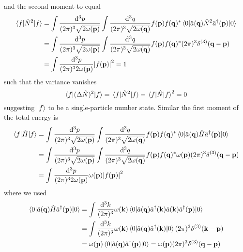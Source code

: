 and the second moment to equal
\begin{equation}
	\begin{split}
		\expval{\hat{N}^2}{f}
		&=
		\int\frac{\dd[3]{p}}{(2\pi)^3\sqrt{2\omega(\vb{p})}}
		\int\frac{\dd[3]{q}}{(2\pi)^3\sqrt{2\omega(\vb{q})}}
		f(\vb{p})f(\vb{q})^*
		\expval{\hat{a}(\vb{q})\hat{N}^2\hat{a}^\dagger(\vb{p})}{0}
		\\
		&=
		\int\frac{\dd[3]{p}}{(2\pi)^3\sqrt{2\omega(\vb{p})}}
		\int\frac{\dd[3]{q}}{(2\pi)^3\sqrt{2\omega(\vb{q})}}
		f(\vb{p})f(\vb{q})^*
		(2\pi)^3\delta^{(3)}(\vb{q}-\vb{p})
		\\
		&=
		\int\frac{\dd[3]{p}}{(2\pi)^32\omega(\vb{p})}
		\abs{f(\vb{p})}^2
		=
		1
	\end{split}
\end{equation}
such that the variance vanishes
\begin{equation}
	\expval{(\Delta\hat{N})^2}{f}
	=
	\expval{\hat{N}^2}{f}
	-
	\expval{\hat{N}}{f}^2
	=
	0
\end{equation}
suggesting $\ket{f}$ to be a single-particle number state.
Similar the first moment of the total energy is
\begin{equation}
	\begin{split}
		\expval{\hat{H}}{f}
		&=
		\int\frac{\dd[3]{p}}{(2\pi)^3\sqrt{2\omega(\vb{p})}}
		\int\frac{\dd[3]{q}}{(2\pi)^3\sqrt{2\omega(\vb{q})}}
		f(\vb{p})f(\vb{q})^*
		\expval{\hat{a}(\vb{q})\hat{H}\hat{a}^\dagger(\vb{p})}{0}
		\\
		&=
		\int\frac{\dd[3]{p}}{(2\pi)^3\sqrt{2\omega(\vb{p})}}
		\int\frac{\dd[3]{q}}{(2\pi)^3\sqrt{2\omega(\vb{q})}}
		f(\vb{p})f(\vb{q})^*
		\omega(\vb{p})
		(2\pi)^3\delta^{(3)}(\vb{q}-\vb{p})
		\\
		&=
		\int\frac{\dd[3]{p}}{(2\pi)^32\omega(\vb{p})}
		\omega(\vb{p})
		\abs{f(\vb{p})}^2
	\end{split}
\end{equation}
where we used
\begin{equation}
	\begin{split}
		\expval{\hat{a}(\vb{q})\hat{H}\hat{a}^\dagger(\vb{p})}{0}
		&=
		\int\frac{\dd[3]{k}}{(2\pi)^3}
		\omega(\vb{k})
		\expval{\hat{a}(\vb{q})\hat{a}^\dagger(\vb{k})\hat{a}(\vb{k})\hat{a}^\dagger(\vb{p})}{0}
		\\
		&=
		\int\frac{\dd[3]{k}}{(2\pi)^3}
		\omega(\vb{k})
		\expval{\hat{a}(\vb{q})\hat{a}^\dagger(\vb{k})}{0}
		(2\pi)^3\delta^{(3)}(\vb{k}-\vb{p})
		\\
		&=
		\omega(\vb{p})
		\expval{\hat{a}(\vb{q})\hat{a}^\dagger(\vb{p})}{0}
		=
		\omega(\vb{p})
		(2\pi)^3\delta^{(3)}(\vb{q}-\vb{p})
	\end{split}	
\end{equation}
